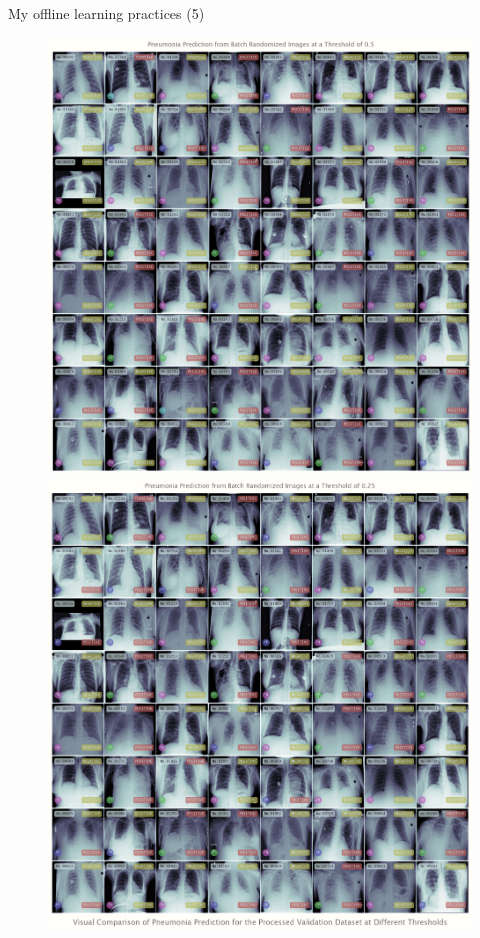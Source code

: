 \documentclass{beamer}
\begin{document}
	\begin{frame}[fragile]{My offline learning practices (5)}
		\begin{figure}[!htb]
			\vspace{-.25em}
			\centering\includegraphics[width=\linewidth]{images/deep_learning_5_1_1.png}
			\endminipage\hfill
			\centering\includegraphics[width=\linewidth]{images/deep_learning_5_1_2.png}

\end{figure}
\end{frame}
\end{document}

